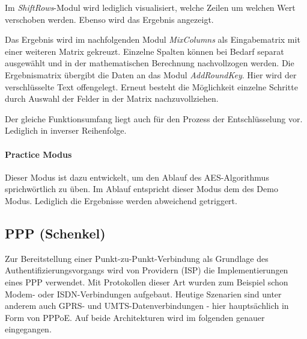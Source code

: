    Im \textit{ShiftRows}-Modul wird lediglich visualisiert, welche Zeilen um welchen Wert verschoben
   werden. Ebenso wird das Ergebnis angezeigt.

   Das Ergebnis wird im nachfolgenden Modul \textit{MixColumns} als Eingabematrix mit einer weiteren
   Matrix gekreuzt. Einzelne Spalten können bei Bedarf separat ausgewählt und in der
   mathematischen Berechnung nachvollzogen werden. Die Ergebnismatrix übergibt die Daten
   an das Modul \textit{AddRoundKey}.
   Hier wird der verschlüsselte Text offengelegt. Erneut besteht die Möglichkeit einzelne Schritte
   durch Auswahl der Felder in der Matrix nachzuvollziehen.

   Der gleiche Funktionsumfang liegt auch für den Prozess der Entschlüsselung vor. Lediglich in
   inverser Reihenfolge\cite{michiganuni}.

   \paragraph{Practice Modus}
   Dieser Modus ist dazu entwickelt, um den Ablauf des AES-Algorithmus sprichwörtlich zu üben.
   Im Ablauf entspricht dieser Modus dem des Demo Modus. Lediglich die Ergebnisse werden
   abweichend getriggert.



\subsection{PPP (Schenkel)}
Zur Bereitstellung einer Punkt-zu-Punkt-Verbindung als Grundlage des Authentifizierungsvorgangs
wird von Providern (\ac{ISP}) die Implementierungen eines
\ac{PPP} verwendet. Mit Protokollen dieser Art wurden zum Beispiel schon Modem- oder ISDN-Verbindungen
aufgebaut. Heutige Szenarien sind unter anderem auch GPRS- und UMTS-Datenverbindungen -
hier hauptsächlich in
Form von \ac{PPPoE}. Auf beide Architekturen wird im folgenden
genauer eingegangen.

